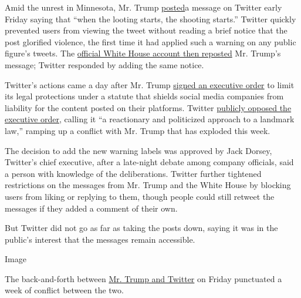Amid the unrest in Minnesota, Mr. Trump
\href{https://twitter.com/realDonaldTrump/status/1266231100780744704}{posted}a
message on Twitter early Friday saying that ``when the looting starts,
the shooting starts.'' Twitter quickly prevented users from viewing the
tweet without reading a brief notice that the post glorified violence,
the first time it had applied such a warning on any public figure's
tweets. The
\href{https://twitter.com/WhiteHouse/status/1266342941649506304}{official
White House account then reposted} Mr. Trump's message; Twitter
responded by adding the same notice.

Twitter's actions came a day after Mr. Trump
\href{https://www.nytimes3xbfgragh.onion/2020/05/28/us/politics/trump-jack-dorsey.html}{signed
an executive order} to limit its legal protections under a statute that
shields social media companies from liability for the content posted on
their platforms. Twitter
\href{https://twitter.com/Policy/status/1266170586197262337}{publicly
opposed the executive order}, calling it ``a reactionary and politicized
approach to a landmark law,'' ramping up a conflict with Mr. Trump that
has exploded this week.

The decision to add the new warning labels was approved by Jack Dorsey,
Twitter's chief executive, after a late-night debate among company
officials, said a person with knowledge of the deliberations. Twitter
further tightened restrictions on the messages from Mr. Trump and the
White House by blocking users from liking or replying to them, though
people could still retweet the messages if they added a comment of their
own.

But Twitter did not go as far as taking the posts down, saying it was in
the public's interest that the messages remain accessible.

Image

The back-and-forth between
\href{https://www.nytimes3xbfgragh.onion/2020/06/03/us/politics/trump-twitter-fact-check.html}{Mr.
Trump and Twitter} on Friday punctuated a week of conflict between the
two.

